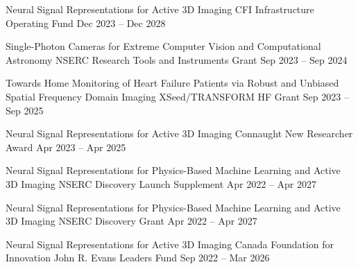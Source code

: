 \cventry[0.5em]{}
{Neural Signal Representations for Active 3D Imaging}
{CFI Infrastructure Operating Fund}
{Dec 2023 -- Dec 2028}
{}
{}

\cventry[0.5em]{}
{Single-Photon Cameras for Extreme Computer Vision and Computational Astronomy}
{NSERC Research Tools and Instruments Grant}
{Sep 2023 -- Sep 2024}
{}
{}

\cventry[0.5em]{}
{\small Towards Home Monitoring of Heart Failure Patients via Robust and Unbiased Spatial Frequency Domain Imaging}
{XSeed/TRANSFORM HF Grant}
{\hspace{-13em}Sep 2023 -- Sep 2025}
{}
{}

\cventry[0.5em]{}
{Neural Signal Representations for Active 3D Imaging}
{Connaught New Researcher Award}
{\hspace{-1em}Apr 2023 -- Apr 2025}
{}
{}

\cventry[0.5em]{}
{Neural Signal Representations for Physics-Based Machine Learning and Active 3D Imaging}
{NSERC Discovery Launch Supplement}
{\hspace{-1em}Apr 2022 -- Apr 2027}
{}
{}

\cventry[0.5em]{}
{Neural Signal Representations for Physics-Based Machine Learning and Active 3D Imaging}
{NSERC Discovery Grant}
{\hspace{-1em}Apr 2022 -- Apr 2027}
{}
{}

\cventry[0.5em]{}
{Neural Signal Representations for Active 3D Imaging}
{Canada Foundation for Innovation John R. Evans Leaders Fund}
{Sep 2022 -- Mar 2026}
{}
{}

\endgroup
\endinput
